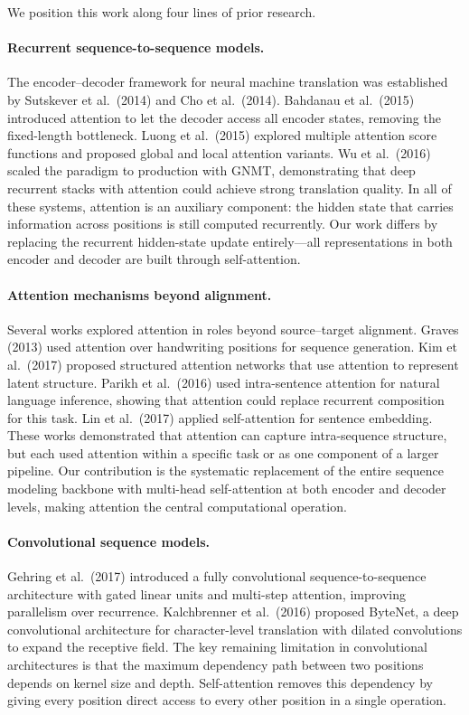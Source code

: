 ﻿\documentclass{article}
\begin{document}
We position this work along four lines of prior research.

\paragraph{Recurrent sequence-to-sequence models.}
The encoder--decoder framework for neural machine translation was established by Sutskever et al.\ (2014) and Cho et al.\ (2014). Bahdanau et al.\ (2015) introduced attention to let the decoder access all encoder states, removing the fixed-length bottleneck. Luong et al.\ (2015) explored multiple attention score functions and proposed global and local attention variants. Wu et al.\ (2016) scaled the paradigm to production with GNMT, demonstrating that deep recurrent stacks with attention could achieve strong translation quality. In all of these systems, attention is an auxiliary component: the hidden state that carries information across positions is still computed recurrently. Our work differs by replacing the recurrent hidden-state update entirely---all representations in both encoder and decoder are built through self-attention.

\paragraph{Attention mechanisms beyond alignment.}
Several works explored attention in roles beyond source--target alignment. Graves (2013) used attention over handwriting positions for sequence generation. Kim et al.\ (2017) proposed structured attention networks that use attention to represent latent structure. Parikh et al.\ (2016) used intra-sentence attention for natural language inference, showing that attention could replace recurrent composition for this task. Lin et al.\ (2017) applied self-attention for sentence embedding. These works demonstrated that attention can capture intra-sequence structure, but each used attention within a specific task or as one component of a larger pipeline. Our contribution is the systematic replacement of the entire sequence modeling backbone with multi-head self-attention at both encoder and decoder levels, making attention the central computational operation.

\paragraph{Convolutional sequence models.}
Gehring et al.\ (2017) introduced a fully convolutional sequence-to-sequence architecture with gated linear units and multi-step attention, improving parallelism over recurrence. Kalchbrenner et al.\ (2016) proposed ByteNet, a deep convolutional architecture for character-level translation with dilated convolutions to expand the receptive field. The key remaining limitation in convolutional architectures is that the maximum dependency path between two positions depends on kernel size and depth. Self-attention removes this dependency by giving every position direct access to every other position in a single operation.
\end{document}
